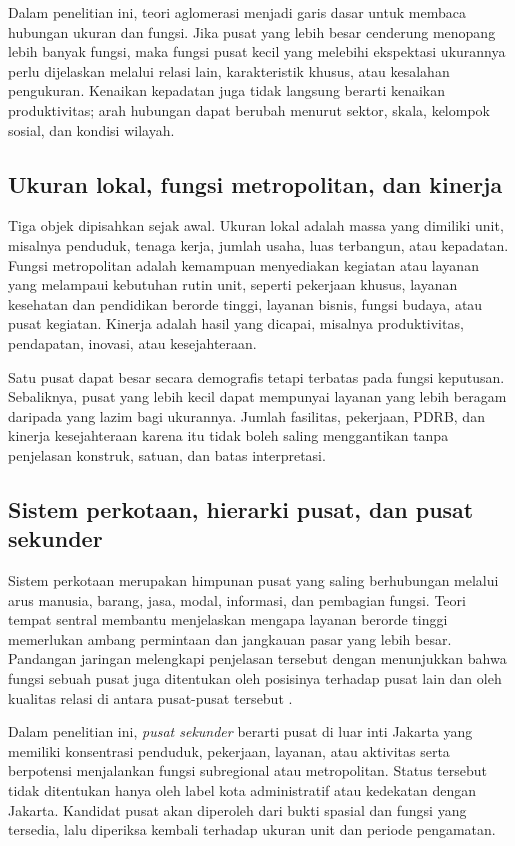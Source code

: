 \documentclass[11pt,a4paper,oneside,openany,indonesian]{report}
\begin{document}
Dalam penelitian ini, teori aglomerasi menjadi garis dasar untuk membaca hubungan ukuran dan fungsi. Jika pusat yang lebih besar cenderung menopang lebih banyak fungsi, maka fungsi pusat kecil yang melebihi ekspektasi ukurannya perlu dijelaskan melalui relasi lain, karakteristik khusus, atau kesalahan pengukuran. Kenaikan kepadatan juga tidak langsung berarti kenaikan produktivitas; arah hubungan dapat berubah menurut sektor, skala, kelompok sosial, dan kondisi wilayah.

\subsection{Ukuran lokal, fungsi metropolitan, dan kinerja}

Tiga objek dipisahkan sejak awal. Ukuran lokal adalah massa yang dimiliki unit, misalnya penduduk, tenaga kerja, jumlah usaha, luas terbangun, atau kepadatan. Fungsi metropolitan adalah kemampuan menyediakan kegiatan atau layanan yang melampaui kebutuhan rutin unit, seperti pekerjaan khusus, layanan kesehatan dan pendidikan berorde tinggi, layanan bisnis, fungsi budaya, atau pusat kegiatan. Kinerja adalah hasil yang dicapai, misalnya produktivitas, pendapatan, inovasi, atau kesejahteraan.

Satu pusat dapat besar secara demografis tetapi terbatas pada fungsi keputusan. Sebaliknya, pusat yang lebih kecil dapat mempunyai layanan yang lebih beragam daripada yang lazim bagi ukurannya. Jumlah fasilitas, pekerjaan, PDRB, dan kinerja kesejahteraan karena itu tidak boleh saling menggantikan tanpa penjelasan konstruk, satuan, dan batas interpretasi.

\subsection{Sistem perkotaan, hierarki pusat, dan pusat sekunder}

Sistem perkotaan merupakan himpunan pusat yang saling berhubungan melalui arus manusia, barang, jasa, modal, informasi, dan pembagian fungsi. Teori tempat sentral membantu menjelaskan mengapa layanan berorde tinggi memerlukan ambang permintaan dan jangkauan pasar yang lebih besar. Pandangan jaringan melengkapi penjelasan tersebut dengan menunjukkan bahwa fungsi sebuah pusat juga ditentukan oleh posisinya terhadap pusat lain dan oleh kualitas relasi di antara pusat-pusat tersebut \parencite{burgermeijers2016}.

Dalam penelitian ini, \textit{pusat sekunder} berarti pusat di luar inti Jakarta yang memiliki konsentrasi penduduk, pekerjaan, layanan, atau aktivitas serta berpotensi menjalankan fungsi subregional atau metropolitan. Status tersebut tidak ditentukan hanya oleh label kota administratif atau kedekatan dengan Jakarta. Kandidat pusat akan diperoleh dari bukti spasial dan fungsi yang tersedia, lalu diperiksa kembali terhadap ukuran unit dan periode pengamatan.
\end{document}
